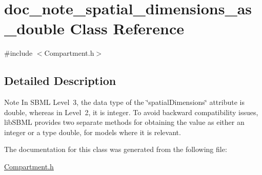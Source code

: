 \hypertarget{classdoc__note__spatial__dimensions__as__double}{}\section{doc\+\_\+note\+\_\+spatial\+\_\+dimensions\+\_\+as\+\_\+double Class Reference}
\label{classdoc__note__spatial__dimensions__as__double}


{\ttfamily \#include $<$Compartment.\+h$>$}



\subsection{Detailed Description}
\begin{DoxyNote}{Note}
In S\+B\+ML Level~3, the data type of the \char`\"{}spatial\+Dimensions\char`\"{} attribute is {\ttfamily double}, whereas in Level~2, it is {\ttfamily integer}. To avoid backward compatibility issues, lib\+S\+B\+ML provides two separate methods for obtaining the value as either an integer or a type {\ttfamily double}, for models where it is relevant. 
\end{DoxyNote}


The documentation for this class was generated from the following file\+:\begin{DoxyCompactItemize}
\item 
\hyperlink{_compartment_8h}{Compartment.\+h}\end{DoxyCompactItemize}
